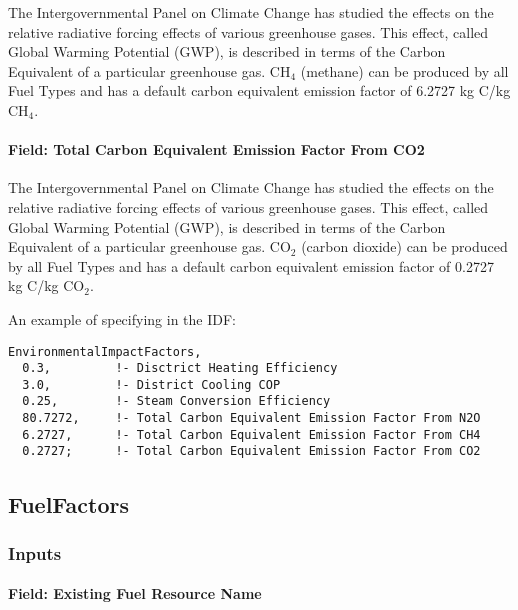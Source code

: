 The Intergovernmental Panel on Climate Change has studied the effects on the relative radiative forcing effects of various greenhouse gases. This effect, called Global Warming Potential (GWP), is described in terms of the Carbon Equivalent of a particular greenhouse gas. CH\(_{4}\) (methane) can be produced by all Fuel Types and has a default carbon equivalent emission factor of 6.2727 kg C/kg CH\(_{4}\).

\paragraph{Field: Total Carbon Equivalent Emission Factor From CO2}\label{field-total-carbon-equivalent-emission-factor-from-co2}

The Intergovernmental Panel on Climate Change has studied the effects on the relative radiative forcing effects of various greenhouse gases. This effect, called Global Warming Potential (GWP), is described in terms of the Carbon Equivalent of a particular greenhouse gas. CO\(_{2}\) (carbon dioxide) can be produced by all Fuel Types and has a default carbon equivalent emission factor of 0.2727 kg C/kg CO\(_{2}\).

An example of specifying in the IDF:

\begin{lstlisting}
EnvironmentalImpactFactors,
  0.3,         !- Disctrict Heating Efficiency
  3.0,         !- District Cooling COP
  0.25,        !- Steam Conversion Efficiency
  80.7272,     !- Total Carbon Equivalent Emission Factor From N2O
  6.2727,      !- Total Carbon Equivalent Emission Factor From CH4
  0.2727;      !- Total Carbon Equivalent Emission Factor From CO2
\end{lstlisting}

\subsection{FuelFactors}\label{fuelfactors}

\subsubsection{Inputs}\label{inputs-11-015}

\paragraph{Field: Existing Fuel Resource Name}\label{field-existing-fuel-resource-name}

